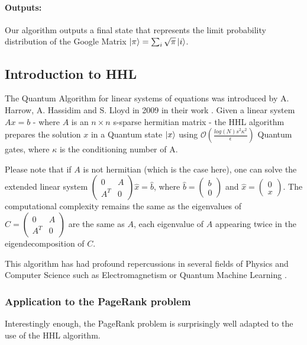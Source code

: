 \documentclass[sn-mathphys]{sn-jnl}%
\theoremstyle{thmstyleone}%
\theoremstyle{thmstyletwo}%
\theoremstyle{thmstylethree}%
\begin{document}
\paragraph{Outputs:}
Our algorithm outputs a final state that represents the limit
probability distribution of the Google Matrix
$\ket{\pi} = \sum_i \sqrt{\pi} \ket{i}$.

\subsection{Introduction to HHL}

The Quantum Algorithm for linear systems of equations was introduced
by A. Harrow, A. Hassidim and S. Lloyd in 2009 in their work
\cite{Harrow_2009}. Given a linear system $Ax = b$ - where $A$ is an
$n \times n$ s-sparse hermitian matrix - the HHL algorithm prepares
the solution $x$ in a Quantum state $\ket{x}$ using
$\mathcal{O}(\frac{log(N) s^2 \kappa^2}{\epsilon})$ Quantum gates,
where $\kappa$ is the conditioning number of A.

Please note that if $A$ is not hermitian (which is the case here), one
can solve the extended linear system
$\begin{pmatrix} 0 & A \\ A^T & 0 \end{pmatrix} \hat{x} = \hat{b}$,
where $\hat{b} = \begin{pmatrix} b \\ 0 \end{pmatrix}$ and
$\hat{x} = \begin{pmatrix} 0 \\ x \end{pmatrix}$. The computational
complexity remains the same as the eigenvalues of
$C = \begin{pmatrix} 0 & A \\ A^T & 0 \end{pmatrix}$ are the same as
$A$, each eigenvalue of $A$ appearing twice in the eigendecomposition
of $C$.

This algorithm has had profound repercussions in several fields of
Physics and Computer Science such as Electromagnetism
\cite{Clader_2013} or Quantum Machine Learning \cite{Zhao_2019}.

\subsubsection{Application to the PageRank problem}
Interestingly enough, the PageRank problem is surprisingly well
adapted to the use of the HHL algorithm.
\end{document}
